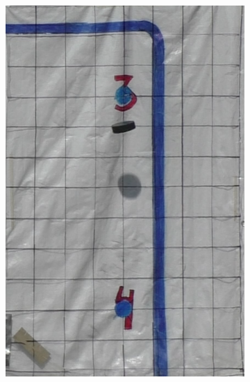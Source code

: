 \documentclass[a4paper,12pt]{report}
\begin{document}
\begin{figure}[ht]
\begin{subfigure}[t]{0.24\textwidth}
    \includegraphics[width=\linewidth]{photos/skott3.png}
  \end{subfigure}%
  \hspace*{\fill}
  \begin{subfigure}[t]{0.24\textwidth}
    \centering

\end{subfigure}
\end{figure}
\end{document}

